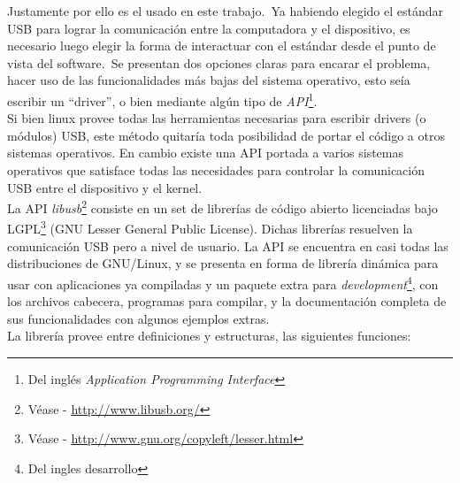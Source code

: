 Justamente por ello es el usado en este trabajo.\ Ya habiendo elegido el
est\'andar USB para lograr la comunicaci\'on entre la computadora y el
dispositivo, es necesario luego elegir la forma de interactuar con el
est\'andar desde el punto de vista del software.\ Se presentan dos opciones
claras para encarar el problema, hacer uso de las funcionalidades m\'as bajas
del sistema operativo, esto se\'ia escribir un ``driver'', o bien mediante
alg\'un tipo de \emph{API}\footnote{Del ingl\'es \emph{Application Programming
Interface}}.\\

Si bien linux provee todas las herramientas necesarias para escribir drivers (o
m\'odulos) USB, este m\'etodo quitar\'ia toda posibilidad de portar el c\'odigo
a otros sistemas operativos. En cambio existe una API portada a varios sistemas
operativos que satisface todas las necesidades para controlar la
comunicaci\'on USB entre el dispositivo y el kernel.\\

La API \emph{libusb}\footnote{V\'ease - \url{http://www.libusb.org/}} consiste
en un set de librer\'ias de c\'odigo abierto licenciadas bajo
LGPL\footnote{V\'ease - \url{http://www.gnu.org/copyleft/lesser.html}} (GNU
Lesser General Public License). 
Dichas librer\'ias resuelven la comunicaci\'on USB pero a nivel de usuario.
La API se encuentra en casi todas las distribuciones de GNU/Linux, y se
presenta en forma de librer\'ia din\'amica para usar con aplicaciones ya
compiladas y un paquete extra para \emph{development}\footnote{Del ingles
desarrollo}, con los archivos cabecera, programas para compilar, y
la documentaci\'on completa de sus funcionalidades con algunos ejemplos
extras.\\

La librer\'ia provee entre definiciones y estructuras, las siguientes
funciones:

